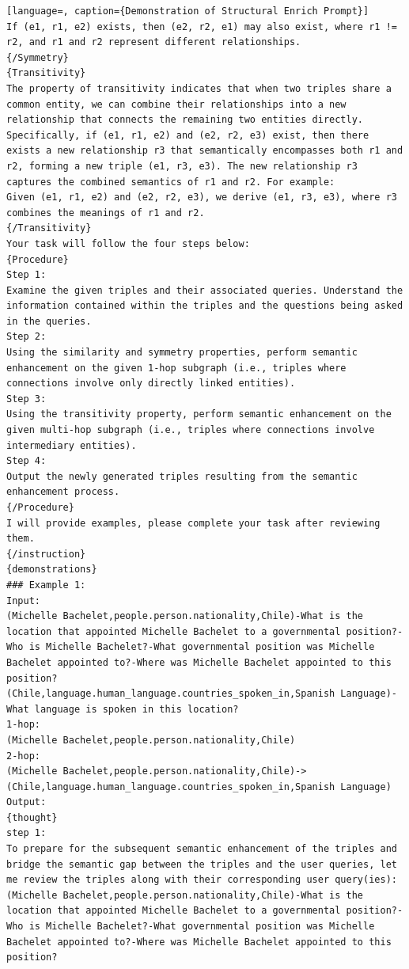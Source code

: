 \documentclass[11pt]{article}
\begin{document}
\begin{lstlisting}[language=, caption={Demonstration of Structural Enrich Prompt}]
If (e1, r1, e2) exists, then (e2, r2, e1) may also exist, where r1 != r2, and r1 and r2 represent different relationships.
{/Symmetry}
{Transitivity}
The property of transitivity indicates that when two triples share a common entity, we can combine their relationships into a new relationship that connects the remaining two entities directly. Specifically, if (e1, r1, e2) and (e2, r2, e3) exist, then there exists a new relationship r3 that semantically encompasses both r1 and r2, forming a new triple (e1, r3, e3). The new relationship r3 captures the combined semantics of r1 and r2. For example:
Given (e1, r1, e2) and (e2, r2, e3), we derive (e1, r3, e3), where r3 combines the meanings of r1 and r2.
{/Transitivity}
Your task will follow the four steps below:
{Procedure}
Step 1:
Examine the given triples and their associated queries. Understand the information contained within the triples and the questions being asked in the queries.
Step 2:
Using the similarity and symmetry properties, perform semantic enhancement on the given 1-hop subgraph (i.e., triples where connections involve only directly linked entities).
Step 3:
Using the transitivity property, perform semantic enhancement on the given multi-hop subgraph (i.e., triples where connections involve intermediary entities).
Step 4:
Output the newly generated triples resulting from the semantic enhancement process.
{/Procedure}
I will provide examples, please complete your task after reviewing them.
{/instruction}
{demonstrations}
### Example 1:
Input:
(Michelle Bachelet,people.person.nationality,Chile)-What is the location that appointed Michelle Bachelet to a governmental position?-Who is Michelle Bachelet?-What governmental position was Michelle Bachelet appointed to?-Where was Michelle Bachelet appointed to this position?
(Chile,language.human_language.countries_spoken_in,Spanish Language)-What language is spoken in this location?
1-hop:
(Michelle Bachelet,people.person.nationality,Chile)
2-hop:
(Michelle Bachelet,people.person.nationality,Chile)->(Chile,language.human_language.countries_spoken_in,Spanish Language)
Output:
{thought}
step 1:
To prepare for the subsequent semantic enhancement of the triples and bridge the semantic gap between the triples and the user queries, let me review the triples along with their corresponding user query(ies):
(Michelle Bachelet,people.person.nationality,Chile)-What is the location that appointed Michelle Bachelet to a governmental position?-Who is Michelle Bachelet?-What governmental position was Michelle Bachelet appointed to?-Where was Michelle Bachelet appointed to this position?

\end{lstlisting}
\end{document}
